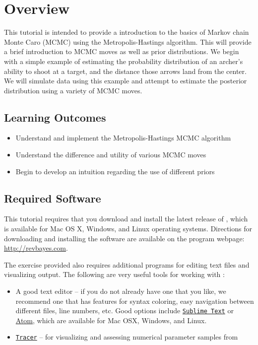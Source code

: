 
\section{Overview}\label{sect:Overview}

This tutorial is intended to provide a introduction to the basics of Markov chain Monte Caro (MCMC) using the  Metropolis-Hastings algorithm. This will provide a brief introduction to MCMC moves as well as prior distributions. We begin with a simple example of estimating the probability distribution of an archer's ability to shoot at a target, and the distance those arrows land from the center. We will simulate data using this example and attempt to estimate the posterior distribution using a variety of MCMC moves. 

\bigskip
\subsection{Learning Outcomes}
\begin{itemize}
\item Understand and implement the Metropolis-Hastings MCMC algorithm
\item Understand the difference and utility of various MCMC moves 
\item Begin to develop an intuition regarding the use of different priors 
\end{itemize}

\subsection{Required Software}\label{subsect:Overview-Requirements}

This tutorial requires that you download and install the latest release of \RevBayes \citep{Hoehna2017a}, which is available for Mac OS X, Windows, and Linux operating systems. 
Directions for downloading and installing the software are available on the program webpage:
\href{http://revbayes.com/}{http://revbayes.com}.

The exercise provided also requires additional programs for editing text files and visualizing output. 
The following are very useful tools for working with \RevBayes:
\begin{itemize}[noitemsep,topsep=0pt]
\item A good text editor -- if you do not already have one that you like, we recommend one that has features for syntax coloring, easy navigation between different files, line numbers, etc.
Good options include \href{http://www.sublimetext.com/}{\tt Sublime Text} or \href{https://atom.io/}{Atom}, which are available for Mac OSX, Windows, and Linux.
\item \href{http://tree.bio.ed.ac.uk/software/tracer/}{\tt Tracer} -- for visualizing and assessing numerical parameter samples from \RevBayes
\end{itemize}

